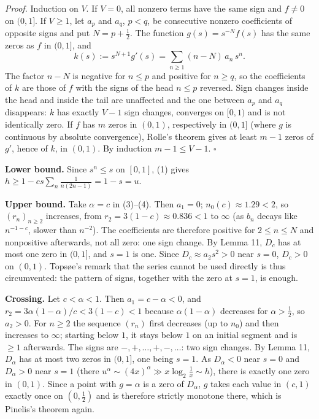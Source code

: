 \documentclass[
  11pt,
]{article}
\begin{document}
\emph{Proof.} Induction on \(V\). If \(V = 0\), all nonzero terms have
the same sign and \(f \ne 0\) on \((0,1]\). If \(V \ge 1\), let \(a_p\)
and \(a_q\), \(p < q\), be consecutive nonzero coefficients of opposite
signs and put \(N = p + \tfrac12\). The function \(g(s) = s^{-N} f(s)\)
has the same zeros as \(f\) in \((0,1]\), and \[
k(s) := s^{N+1} g'(s) = \sum_{n\ge1} (n - N)\, a_n\, s^n .
\] The factor \(n - N\) is negative for \(n \le p\) and positive for
\(n \ge q\), so the coefficients of \(k\) are those of \(f\) with the
signs of the head \(n \le p\) reversed. Sign changes inside the head and
inside the tail are unaffected and the one between \(a_p\) and \(a_q\)
disappears: \(k\) has exactly \(V-1\) sign changes, converges on
\([0,1)\) and is not identically zero. If \(f\) has \(m\) zeros in
\((0,1)\), respectively in \((0,1]\) (where \(g\) is continuous by
absolute convergence), Rolle's theorem gives at least \(m-1\) zeros of
\(g'\), hence of \(k\), in \((0,1)\). By induction \(m - 1 \le V - 1\).
\(\square\)

\textbf{Lower bound.} Since \(s^n \le s\) on \([0,1]\), (1) gives
\(h \ge 1 - cs\sum_n \frac{1}{n(2n-1)} = 1 - s = u\).

\textbf{Upper bound.} Take \(\alpha = c\) in (3)--(4). Then \(a_1 = 0\);
\(n_0(c) \approx 1.29 < 2\), so \((r_n)_{n \ge 2}\) increases, from
\(r_2 = 3(1-c) \approx 0.836 < 1\) to \(\infty\) (as \(b_n\) decays like
\(n^{-1-c}\), slower than \(n^{-2}\)). The coefficients are therefore
positive for \(2 \le n \le N\) and nonpositive afterwards, not all zero:
one sign change. By Lemma 11, \(D_c\) has at most one zero in \((0,1]\),
and \(s = 1\) is one. Since \(D_c \approx a_2 s^2 > 0\) near \(s = 0\),
\(D_c > 0\) on \((0,1)\). Topsøe's remark that the series cannot be used
directly is thus circumvented: the pattern of signs, together with the
zero at \(s = 1\), is enough.

\textbf{Crossing.} Let \(c < \alpha < 1\). Then
\(a_1 = c - \alpha < 0\), and \(r_2 = 3\alpha(1-\alpha)/c < 3(1-c) < 1\)
because \(\alpha(1-\alpha)\) decreases for \(\alpha > \tfrac12\), so
\(a_2 > 0\). For \(n \ge 2\) the sequence \((r_n)\) first decreases (up
to \(n_0\)) and then increases to \(\infty\); starting below \(1\), it
stays below \(1\) on an initial segment and is \(\ge 1\) afterwards. The
signs are \(-,+,\dots,+,-,\dots\): two sign changes. By Lemma 11,
\(D_\alpha\) has at most two zeros in \((0,1]\), one being \(s = 1\). As
\(D_\alpha < 0\) near \(s = 0\) and \(D_\alpha > 0\) near \(s = 1\)
(there \(u^\alpha \sim (4x)^\alpha \gg x\log_2\frac1x \sim h\)), there
is exactly one zero in \((0,1)\). Since a point with \(g = \alpha\) is a
zero of \(D_\alpha\), \(g\) takes each value in \((c,1)\) exactly once
on \((0,\tfrac12)\) and is therefore strictly monotone there, which is
Pinelis's theorem again.
\end{document}
